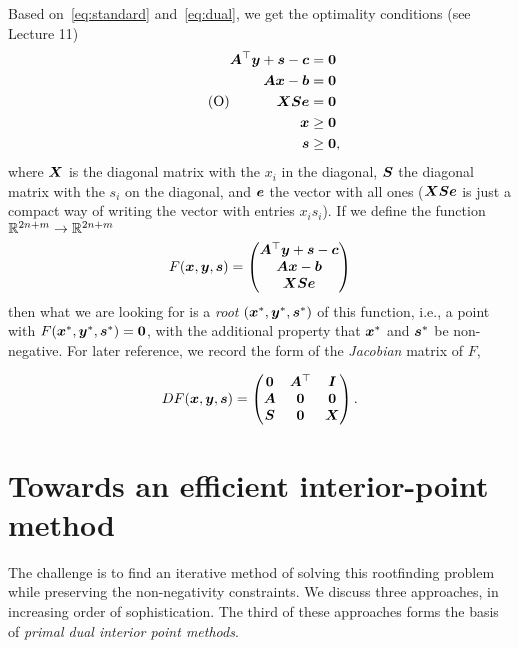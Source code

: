 Based on~\eqref{eq:standard} and~\eqref{eq:dual}, we get the optimality conditions (see Lecture 11)
\begin{align}\label{eq:opt2}\tag{O}
 \begin{split}
  \bm{A}^{\top}\bm{y}+\bm{s}-\bm{c} &= \bm{0}\\
  \bm{A}\bm{x}-\bm{b} & = \bm{0}\\
  \bm{X}\bm{S}\bm{e} &= \bm{0}\\
  \bm{x}&\geq \bm{0}\\
  \bm{s}&\geq \bm{0},
 \end{split}
\end{align}
where $\bm{X}$ is the diagonal matrix with the $x_i$ in the diagonal, $\bm{S}$ the diagonal matrix with the $s_i$ on the diagonal, and $\bm{e}$ the vector with all ones ($\bm{X}\bm{S}\bm{e}$ is just a compact way of writing the vector with entries $x_is_i$).
If we define the function $\mathbb{R}^{2n+m}\to \mathbb{R}^{2n+m}$
\begin{equation}\label{eq:F}
 F(\bm{x},\bm{y},\bm{s}) = \begin{pmatrix}
                               \bm{A}^{\top}\bm{y}+\bm{s}-\bm{c}\\
                               \bm{A}\bm{x}-\bm{b}\\
                               \bm{X}\bm{S}\bm{e} 
                              \end{pmatrix}
\end{equation}
then what we are looking for is a {\em root} $(\bm{x}^*,\bm{y}^*,\bm{s}^*)$ of this function, i.e., a point with $F(\bm{x}^*,\bm{y}^*,\bm{s}^*)=\bm{0}$, with the additional property that $\bm{x}^*$ and $\bm{s}^*$ be non-negative. For later reference, we record the form of the {\em Jacobian} matrix of $F$,

\begin{equation*}
 DF(\bm{x},\bm{y},\bm{s}) = \begin{pmatrix}
\bm{0} & \bm{A}^{\top} & \bm{I} \\
  \bm{A} & \bm{0} & \bm{0} \\
  \bm{S} & \bm{0} & \bm{X}
 \end{pmatrix}.
\end{equation*}

\section{Towards an efficient interior-point method}
The challenge is to find an iterative method of solving this rootfinding problem while preserving the non-negativity constraints. We discuss three approaches, in increasing order of sophistication. The third of these approaches forms the basis of {\em primal dual interior point methods}. 

